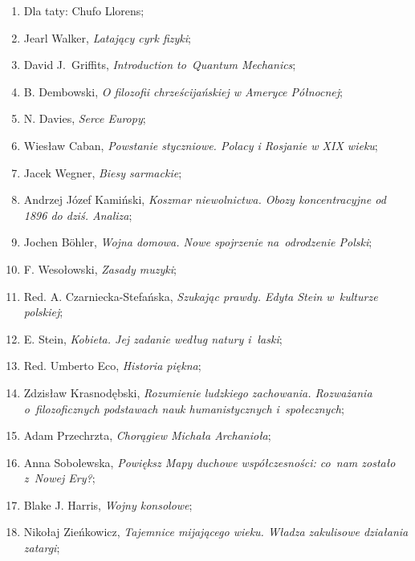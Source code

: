 \documentclass[a4paper,11pt]{article}
\begin{document}
\begin{enumerate}
\item Dla taty: Chufo Llorens;

\item Jearl Walker, \emph{Latający cyrk fizyki};

\item David J.~Griffits, \emph{Introduction to~Quantum Mechanics};

\item B. Dembowski, \emph{O filozofii chrześcijańskiej w Ameryce
    Północnej};

\item N. Davies, \emph{Serce Europy};

\item Wiesław Caban, \emph{Powstanie styczniowe. Polacy i Rosjanie w
    XIX wieku};

\item Jacek Wegner, \emph{Biesy sarmackie};

\item Andrzej Józef Kamiński, \emph{Koszmar niewolnictwa. Obozy
    koncentracyjne od 1896 do dziś. Analiza};

\item Jochen B\"{o}hler, \emph{Wojna domowa. Nowe spojrzenie
    na~odrodzenie Polski};

\item F. Wesołowski, \emph{Zasady muzyki};

\item Red. A. Czarniecka-Stefańska, \emph{Szukając prawdy. Edyta Stein
    w~kulturze polskiej};

\item E. Stein, \emph{Kobieta. Jej zadanie według natury i~łaski};

\item Red. Umberto Eco, \emph{Historia piękna};

\item Zdzisław Krasnodębski, \emph{Rozumienie ludzkiego zachowania.
    Rozważania o~filozoficznych podstawach nauk humanistycznych
    i~społecznych};

\item Adam Przechrzta, \emph{Chorągiew Michała Archanioła};

\item Anna Sobolewska, \emph{Powiększ Mapy duchowe współczesności:
    co~nam zostało z~Nowej Ery?};

\item Blake J. Harris, \emph{Wojny konsolowe};

\item Nikołaj Zieńkowicz, \emph{Tajemnice mijającego wieku. Władza
    zakulisowe działania zatargi};


\end{enumerate}
\end{document}
